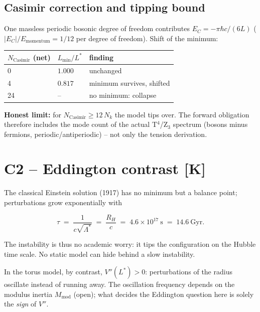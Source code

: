 \subsection{Casimir correction and tipping bound}

One massless periodic bosonic degree of freedom contributes
$E_C = -\pi\hbar c/(6L)$ ($|E_C|/E_\text{momentum} = 1/12$ per
degree of freedom). Shift of the minimum:

\begin{center}
\begin{tabular}{lll}
\toprule
$N_\text{Casimir}$ (net) & $L_{\min}/L^{*}$ & finding \\
\midrule
0  & $1.000$ & unchanged \\
4  & $0.817$ & minimum survives, shifted \\
24 & --      & no minimum: collapse \\
\bottomrule
\end{tabular}
\end{center}

\textbf{Honest limit:} for $N_\text{Casimir} \ge 12\,N_k$ the model
tips over. The forward obligation therefore includes the mode count
of the actual T$^4$/Z$_3$ spectrum (bosons minus fermions,
periodic/antiperiodic) -- not only the tension derivation.

\section{C2 -- Eddington contrast [K]}

The classical Einstein solution (1917) has no minimum but a balance
point; perturbations grow exponentially with

\begin{equation}
  \tau \;=\; \frac{1}{c\sqrt{\Lambda^{*}}} \;=\; \frac{R_H}{c}
  \;=\; 4.6\times10^{17}~\text{s} \;=\; 14.6~\text{Gyr}.
\end{equation}

The instability is thus no academic worry: it tips the configuration
on the Hubble time scale. No static model can hide behind a slow
instability.

In the torus model, by contrast, $V''(L^{*}) > 0$: perturbations of
the radius oscillate instead of running away. The oscillation
frequency depends on the modulus inertia $M_\text{mod}$ (open); what
decides the Eddington question here is solely the \emph{sign} of
$V''$.

